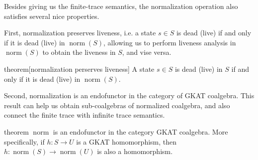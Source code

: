 \documentclass[conference]{IEEEtran}
\DeclareMathOperator{\norm}{\mathrm{norm}}
\newcommand\altxrightarrow[2][0pt]{\mathrel{\ensurestackMath{\stackengine%
  {\dimexpr#1-7.5pt}{\xrightarrow{\phantom{#2}}}{\scriptstyle\!#2\,}%
  {O}{c}{F}{F}{S}}}}
\newcommand{\transvia}[1]{
    \mathrel{\raisebox{-2px}{\(\altxrightarrow[-2px]{#1}\)}}
}
\begin{document}
Besides giving us the finite-trace semantics, the normalization operation also satisfies several nice properties.

First, normalization preserves liveness, i.e. a state \(s ∈ S\) is dead (live) if and only if it is dead (live) in \(\norm(S)\), allowing us to perform liveness analysis in \(\norm(S)\) to obtain the liveness in \(S\), and vise versa.

\begin{theoremEnd}{theorem}[normalization perserves liveness]\label{thm:norm-perserve-liveness}
    A state \(s ∈ S\) is dead (live) in \(S\) if and only if it is dead (live) in \(\norm(S)\).
\end{theoremEnd}


Second, normalization is an endofunctor in the category of GKAT coalgebra. This result can help us obtain sub-coalgebras of normalized coalgebra, and also connect the finite trace with infinite trace semantics.

\begin{theoremEnd}{theorem}\label{thm:norm-functor}
    \(\norm\) is an endofunctor in the category GKAT coalgebra.
    More specifically, if \(h: S → U\) is a GKAT homomorphism, then \(h: \norm(S) → \norm(U)\) is also a homomorphism.
\end{theoremEnd}
\end{document}
